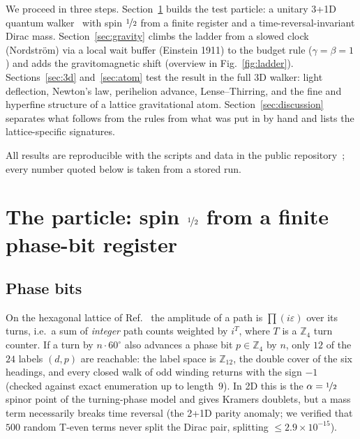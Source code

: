 \documentclass[twocolumn,showpacs,preprintnumbers,amsmath,amssymb]{revtex4-2}
\newcommand{\eps}{\varepsilon}
\begin{document}
We proceed in three steps.
Section~\ref{sec:particle} builds the test particle: a unitary
\mbox{3\!+\!1D} quantum walker~\cite{aharonov1993,strauch2006} with spin
$\nicefrac12$ from a finite register and a time-reversal-invariant Dirac mass.
Section~\ref{sec:gravity} climbs the ladder from a slowed clock (Nordstr\"om)
via a local wait buffer (Einstein 1911) to the budget rule ($\gamma=\beta=1$)
and adds the gravitomagnetic shift (overview in Fig.~\ref{fig:ladder}).
Sections~\ref{sec:3d} and~\ref{sec:atom} test the result in the full 3D walker:
light deflection, Newton's law, perihelion advance, Lense--Thirring, and the
fine and hyperfine structure of a lattice gravitational atom.
Section~\ref{sec:discussion} separates what follows from the rules from what
was put in by hand and lists the lattice-specific signatures.

All results are reproducible with the scripts and data in the public
repository~\cite{repo}; every number quoted below is taken from a stored run.

\section{The particle: spin $\nicefrac12$ from a finite phase-bit register}
\label{sec:particle}

\subsection{Phase bits}

On the hexagonal lattice of Ref.~\cite{schmiereck2026} the amplitude of a path
is $\prod(i\eps)$ over its turns, i.e.\ a sum of \emph{integer} path counts
weighted by $i^{T}$, where $T$ is a $\mathbb{Z}_4$ turn counter.
If a turn by $n\cdot60^\circ$ also advances a phase bit $p\in\mathbb{Z}_4$ by
$n$, only $12$ of the $24$ labels $(d,p)$ are reachable: the label space is
$\mathbb{Z}_{12}$, the double cover of the six headings, and every closed walk
of odd winding returns with the sign $-1$ (checked against exact enumeration
up to length~$9$).
In 2D this is the $\alpha=\nicefrac12$ spinor point of the turning-phase model
and gives Kramers doublets, but a mass term necessarily breaks time reversal
(the \mbox{2\!+\!1D} parity anomaly; we verified that $500$ random T-even terms
never split the Dirac pair, splitting $\le2.9\times10^{-15}$).
\end{document}
